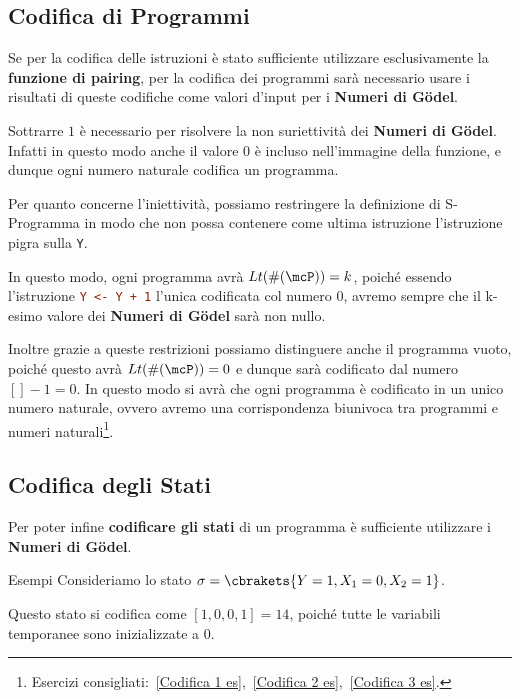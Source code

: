 \subsection{Codifica di Programmi}
Se per la codifica delle istruzioni è stato sufficiente utilizzare esclusivamente la \textbf{funzione di pairing}, per la codifica dei programmi sarà necessario usare i risultati di queste codifiche come valori d'input per i \textbf{Numeri di Gödel}.

Sottrarre \(1\) è necessario per risolvere la non suriettività dei \textbf{Numeri di Gödel}. Infatti in questo modo anche il valore \(0\) è incluso nell'immagine della funzione, e dunque ogni numero naturale codifica un programma.

Per quanto concerne l'iniettività, possiamo restringere la definizione di S-Programma in modo che non possa contenere come ultima istruzione l'istruzione pigra sulla \lstinline{Y}.

In questo modo, ogni programma avrà \(Lt(\#(\mcP))=k\), poiché essendo l'istruzione \lstinline[language=ini]{Y <- Y + 1} l'unica codificata col numero \(0\), avremo sempre che il k-esimo valore dei \textbf{Numeri di Gödel} sarà non nullo.

Inoltre grazie a queste restrizioni possiamo distinguere anche il programma vuoto, poiché questo avrà \(Lt(\#(\mcP))=0\) e dunque sarà codificato dal numero \([]-1=0\). In questo modo si avrà che ogni programma è codificato in un unico numero naturale, ovvero avremo una corrispondenza biunivoca tra programmi e numeri naturali\footnote{Esercizi consigliati:~\ref{Codifica 1 es},~\ref{Codifica 2 es},~\ref{Codifica 3 es}.}.
\newpage
\subsection{Codifica degli Stati}
Per poter infine \textbf{codificare gli stati} di un programma è sufficiente utilizzare i \textbf{Numeri di Gödel}.

\begin{generalbox}[colframe=azure-gradient-3!90!black]{Esempi}
  Consideriamo lo stato \(\sigma=\cbrakets{Y=1, X_1=0, X_2=1}\).

  Questo stato si codifica come \(\left[ 1, 0, 0, 1 \right]=14\), poiché tutte le variabili temporanee sono inizializzate a \(0\).

  \end{generalbox}

